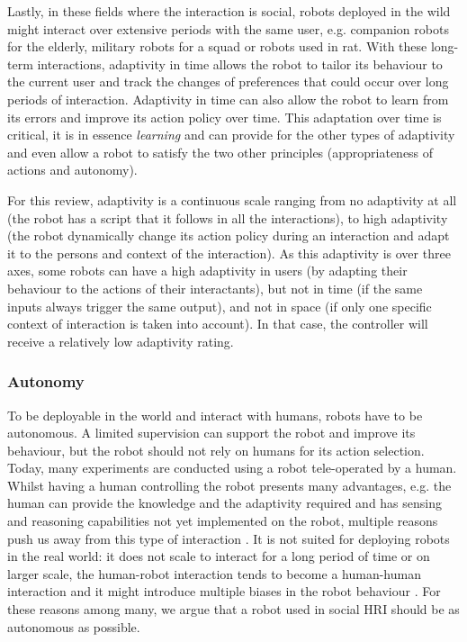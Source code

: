     Lastly, in these fields where the interaction is social, robots deployed in the wild might interact over extensive periods with the same user, e.g. companion robots for the elderly, military robots for a squad or robots used in \gls{rat}. With these long-term interactions, adaptivity in time allows the robot to tailor its behaviour to the current user and track the changes of preferences that could occur over long periods of interaction. Adaptivity in time can also allow the robot to learn from its errors and improve its action policy over time. This adaptation over time is critical, it is in essence \textit{learning} and can provide for the other types of adaptivity and even allow a robot to satisfy the two other principles (appropriateness of actions and autonomy).

    For this review, adaptivity is a continuous scale ranging from no adaptivity at all (the robot has a script that it follows in all the interactions), to high adaptivity (the robot dynamically change its action policy during an interaction and adapt it to the persons and context of the interaction). As this adaptivity is over three axes, some robots can  have a high adaptivity in users (by adapting their behaviour to the actions of their interactants), but not in time (if the same inputs always trigger the same output), and not in space (if only one specific context of interaction is taken into account). In that case, the controller will receive a relatively low adaptivity rating.

\subsubsection{Autonomy}
	To be deployable in the world and interact with humans, robots have to be autonomous. A limited supervision can support the robot and improve its behaviour, but the robot should not rely on humans for its action selection. Today, many experiments are conducted using a robot tele-operated by a human. Whilst having a human controlling the robot presents many advantages, e.g. the human can provide the knowledge and the adaptivity required and has sensing and reasoning capabilities not yet implemented on the robot, multiple reasons push us away from this type of interaction \citep{Thill2013}. It is not suited for deploying robots in the real world: it does not scale to interact for a long period of time or on larger scale, the human-robot interaction tends to become a human-human interaction \citep{baxter2016characterising} and it might introduce multiple biases in the robot behaviour \citep{howley2014effects}. For these reasons among many, we argue that a robot used in social HRI should be as autonomous as possible.
	
